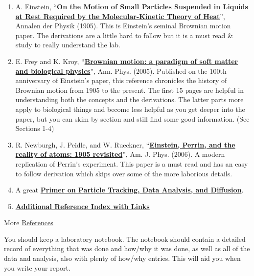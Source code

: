 \documentclass{../lab}
\begin{document}
\begin{enumerate}
    \item A. Einstein, ``\href{https://drive.google.com/file/d/1QTggDbLDW2yFEf3fCtHcC2Zh-ZpG0-Qg/view?usp=drive_link}{\textbf{On the Motion of Small Particles Suspended in Liquids at Rest Required by the Molecular-Kinetic Theory of Heat}}'', Annalen der Physik (1905). This is Einstein’s seminal Brownian motion paper. The derivations are a little hard to follow but it is a must read \& study to really understand the lab.

    \item E. Frey and K. Kroy, ``\href{https://drive.google.com/file/d/17Y9RdOPqRGXhg4R2xxoiwYtJrqyJzSkF/view?usp=drive_link}{\textbf{Brownian motion: a paradigm of soft matter and biological physics}}'', Ann. Phys. (2005). Published on the 100th anniversary of Einstein’s paper, this reference chronicles the history of Brownian motion from 1905 to the present. The first 15 pages are helpful in understanding both the concepts and the derivations. The latter parts more apply to biological things and become less helpful as you get deeper into the paper, but you can skim by section and still find some good information. (See Sections 1-4)

    \item R. Newburgh, J. Peidle, and W. Rueckner, ``\href{https://drive.google.com/file/d/11nXwTIr12yQodIUyReekr16IBNPaWGI-/view?usp=drive_link}{\textbf{Einstein, Perrin, and the reality of atoms: 1905 revisited}}'', Am. J. Phys. (2006). A modern replication of Perrin's experiment. This paper is a must read and has an easy to follow derivation which skips over some of the more laborious details.

    \item A great \href{https://crocker.engineering.upenn.edu/CrockerGrier1996b.pdf}{\textbf{Primer on Particle Tracking, Data Analysis, and Diffusion}}.

    \item \href{https://drive.google.com/file/d/1sRoag3xtYnx2mrpEpQcGUzS4v6m8vQHM/view?usp=drive_link}{\textbf{Additional Reference Index with Links}}
\end{enumerate}

 More \hyperref[sec:References]{References} 

You should keep a laboratory notebook. The notebook should contain a detailed record of everything that was done and how/why it was done, as well as all of the data and analysis, also with plenty of how/why entries. This will aid you when you write your report.
\end{document}
